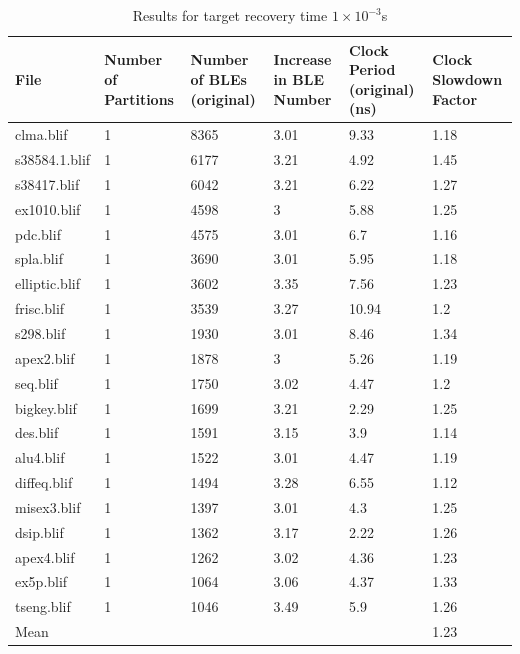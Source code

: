 \documentclass[12pt,final,oneside]{dwThesis} %
\begin{document}
      \begin{table}
      \footnotesize
      \begin{adjustwidth}{-1cm}{-1.2cm}
         \begin{tabularx}{1.1\textwidth}{XXXXXX}
            \toprule
            File & Number of Partitions &  Number of BLEs (original) &  Increase in BLE Number &  Clock Period (original) (ns) &  Clock Slowdown Factor\\
            \midrule
clma.blif & 1 & 8365 & 3.01 & 9.33 & 1.18\\
s38584.1.blif & 1 & 6177 & 3.21 & 4.92 & 1.45\\
s38417.blif & 1 & 6042 & 3.21 & 6.22 & 1.27\\
ex1010.blif & 1 & 4598 & 3 & 5.88 & 1.25\\
pdc.blif & 1 & 4575 & 3.01 & 6.7 & 1.16\\
spla.blif & 1 & 3690 & 3.01 & 5.95 & 1.18\\
elliptic.blif & 1 & 3602 & 3.35 & 7.56 & 1.23\\
frisc.blif & 1 & 3539 & 3.27 & 10.94 & 1.2\\
s298.blif & 1 & 1930 & 3.01 & 8.46 & 1.34\\
apex2.blif & 1 & 1878 & 3 & 5.26 & 1.19\\
seq.blif & 1 & 1750 & 3.02 & 4.47 & 1.2\\
bigkey.blif & 1 & 1699 & 3.21 & 2.29 & 1.25\\
des.blif & 1 & 1591 & 3.15 & 3.9 & 1.14\\
alu4.blif & 1 & 1522 & 3.01 & 4.47 & 1.19\\
diffeq.blif & 1 & 1494 & 3.28 & 6.55 & 1.12\\
misex3.blif & 1 & 1397 & 3.01 & 4.3 & 1.25\\
dsip.blif & 1 & 1362 & 3.17 & 2.22 & 1.26\\
apex4.blif & 1 & 1262 & 3.02 & 4.36 & 1.23\\
ex5p.blif & 1 & 1064 & 3.06 & 4.37 & 1.33\\
tseng.blif & 1 & 1046 & 3.49 & 5.9 & 1.26\\
Mean &         &           &        &          & 1.23\\
\bottomrule
         \end{tabularx}
         \caption{Results for target recovery time $1\times10^{-3}$s}
         \label{Results1e-3}
      \end{adjustwidth}
   \end{table}
   
\end{document}
